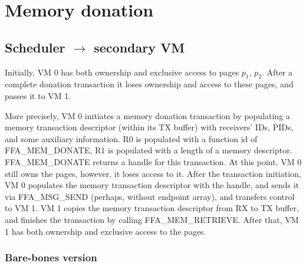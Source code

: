 \documentclass{article}
\begin{document}
\section{Memory donation}

\subsection{Scheduler $\rightarrow$ secondary VM}
Initially, VM 0 has both ownership and exclusive access to pages $p_1$, $p_2$. After a complete donation transaction it loses ownership and access to these pages, and passes it to VM 1.

More precisely, VM 0 initiates a memory donation transaction by populating a memory transaction descriptor (within its TX buffer) with receivers' IDs, PIDs, and some auxiliary information. R0 is populated with a function id of FFA\_MEM\_DONATE, R1 is populated with a length of a memory descriptor. FFA\_MEM\_DONATE returns a handle for this transaction. At this point, VM 0 still owns the pages, however, it loses access to it. After the transaction initiation, VM 0 populates the memory transaction descriptor with the handle, and sends it via FFA\_MSG\_SEND (perhaps, without endpoint array), and transfers control to VM 1. VM 1 copies the memory transaction descriptor from RX to TX buffer, and finishes the transaction by calling FFA\_MEM\_RETRIEVE. After that, VM 1 has both ownership and exclusive access to the pages.

\subsubsection{Bare-bones version}
\end{document}
